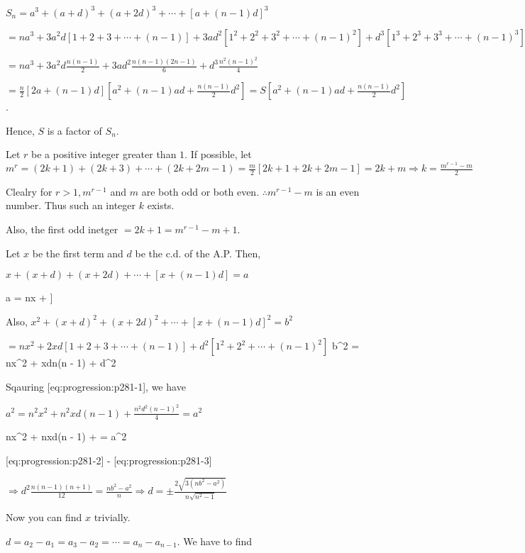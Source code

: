   $S_n = a^3 + (a + d)^3 + (a + 2d)^3 + \cdots + [a + (n - 1)d]^3$

  $= na^3 + 3a^2d[1 + 2 + 3 + \cdots + (n - 1)] + 3ad^2[1^2 + 2^2 + 3^2 + \cdots + (n - 1)^2] + d^3[1^3 +
  2^3 + 3^3 + \cdots + (n - 1)^3]$

  $= na^3 + 3a^2d\frac{n(n - 1)}{2} + 3ad^2\frac{n(n - 1)(2n - 1)}{6} + d^3\frac{n^2(n - 1)^2}{4}$

  $= \frac{n}{2}[2a + (n - 1)d][a^2 + (n - 1)ad + \frac{n(n - 1)}{2}d^2] = S[a^2 + (n - 1)ad + \frac{n(n -
    1)}{2}d^2]$.

  Hence, $S$ is a factor of $S_n$.
\item Let $r$ be a positive integer greater than $1$. If possible, let $m^r = (2k + 1) + (2k + 3) + \cdots +
  (2k + 2m - 1) = \frac{m}{2}[2k + 1 + 2k + 2m - 1] = 2k + m \Rightarrow k = \frac{m^{r- 1} - m}{2}$

  Clealry for $r > 1, m^{r - 1}$ and $m$ are both odd or both even. $\therefore m^{r - 1} - m$ is an even
  number. Thus such an integer $k$ exists.

  Also, the first odd inetger $= 2k + 1 = m^{r - 1} - m + 1$.
\item Let $x$ be the first term and $d$ be the c.d. of the A.P. Then,

  $x + (x + d) + (x + 2d) + \cdots + [x + (n - 1)d] = a$

  \placeformula[eq:progression:p281-1]\startformula a = nx + ]\stopformula

  Also, $x^2 + (x + d)^2 + (x + 2d)^2 + \cdots + [x + (n - 1)d]^2 = b^2$

  $= nx^2 + 2xd[1 + 2 + 3 + \cdots + (n - 1)] + d^2[1^2 + 2^2 + \cdots + (n - 1)^2]$
  \placeformula[eq:progression:p281-2]\startformula b^2 = nx^2 + xdn(n - 1) + d^2\stopformula

  Sqauring [eq:progression:p281-1], we have

  $a^2 = n^2x^2 + n^2xd(n - 1) + \frac{n^2d^2(n - 1)^2}{4} = a^2$

  \placeformula[eq:progression:p281-3]\startformula nx^2 + nxd(n - 1) +  =
  a^2\stopformula

  [eq:progression:p281-2] - [eq:progression:p281-3]

  $\Rightarrow d^2\frac{n(n - 1)(n + 1)}{12} = \frac{nb^2 - a^2}{n}\Rightarrow d = \pm\frac{2\sqrt{3(nb^2 -
      a^2)}}{n\sqrt{n^2 - 1}}$

  Now you can find $x$ trivially.
\item $d = a_2 - a_1 = a_3 - a_2 = \cdots = a_n - a_{n - 1}$. We have to find

